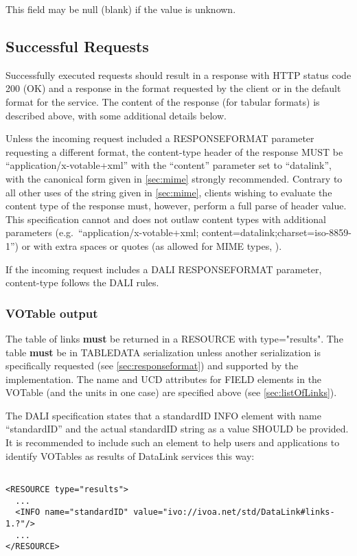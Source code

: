 \documentclass[11pt,a4paper]{ivoa}
\newcommand{\attval}[2]{#1={\allowbreak}{"}#2{"}}
\begin{document}
This field may be null (blank) if the value is unknown.

\subsection{Successful Requests}
\label{sec:successfulRequests}

Successfully executed requests should result in a response with HTTP
status code 200 (OK) and a response in the format requested by the client
or in the default format for the service. The content of the response
(for tabular formats) is described above,
with some additional details below.

Unless the incoming request included a RESPONSEFORMAT parameter requesting
a different format, the content-type header of the response MUST be
``application/x-votable+xml'' with the
``content'' parameter set to ``datalink'',
with the canonical form given in \ref{sec:mime}
strongly recommended. Contrary to
all other uses of the string given in \ref{sec:mime},
clients wishing to evaluate
the content type of the response must, however, perform a full parse
of header value. This specification cannot and does not outlaw content
types with additional parameters
(e.g.\ ``application/x-votable+xml; content=datalink;charset=iso-8859-1'')
or with extra spaces or quotes
(as allowed for MIME types, \citet{std:RFC2045}).

If the incoming request includes a DALI RESPONSEFORMAT parameter,
content-type follows the DALI rules.


\subsubsection{VOTable output}

The table of links {\bf must} be returned in a RESOURCE with
\attval{type}{results}. The table {\bf must} be in TABLEDATA serialization
unless another serialization is specifically requested
(see \ref{sec:responseformat})
and supported by the implementation.
The name and UCD attributes for FIELD elements in the VOTable
(and the units in one case) are specified above (see \ref{sec:listOfLinks}).

The DALI specification states that a standardID INFO element with
name ``standardID'' and the actual standardID string as a value SHOULD
be provided.  It is recommended to include such an element to help users
and applications to identify VOTables as results of DataLink services
this way:
\begin{verbatim}

<RESOURCE type="results">
  ... 
  <INFO name="standardID" value="ivo://ivoa.net/std/DataLink#links-1.?"/> 
  ... 
</RESOURCE>
\end{verbatim}
\end{document}
